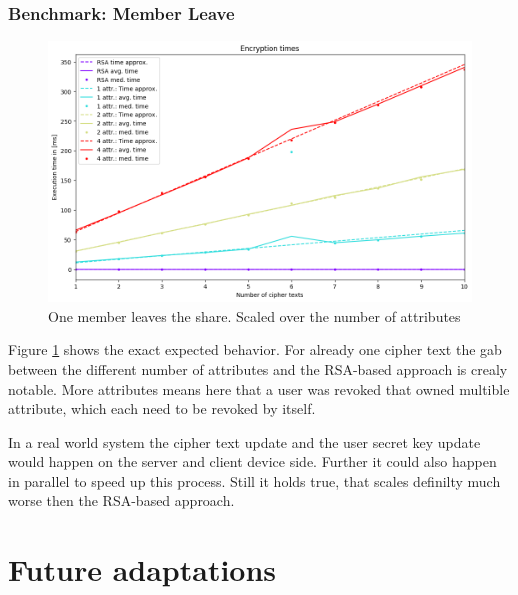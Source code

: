 \subsubsection{Benchmark: Member Leave}
\begin{figure}[!ht]
\centering
    \includegraphics[width=\linewidth]{img/eval-leave/leave_attr_1_users_2.png}
    \caption{One member leaves the share. Scaled over the number of attributes}
    \label{fig:member-leave}
\end{figure}

Figure \ref{fig:member-leave} shows the exact expected behavior. For already one cipher text the gab between the different number of attributes and the RSA-based approach is crealy notable. More attributes means here that a user was revoked that owned multible attribute, which each need to be revoked by itself. 

In a real world system the cipher text update and the user secret key update would happen on the server and client device side. Further it could also happen in parallel to speed up this process. Still it holds true, that \name scales definilty much worse then the RSA-based approach.

\section{Future adaptations}


